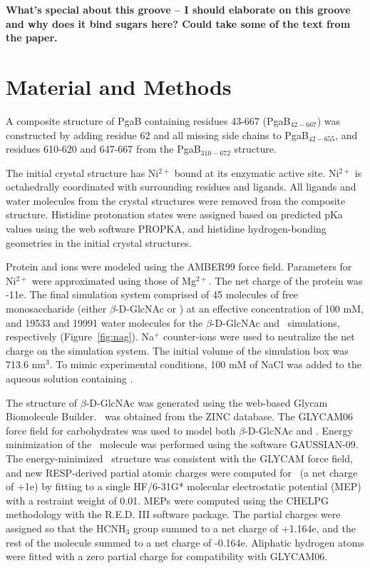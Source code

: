 \textbf{What's special about this groove -- I should elaborate on this groove and why does it bind sugars here? Could take some of the text from the paper.} 


\section{Material and Methods}

A composite structure of PgaB containing residues 43-667 (PgaB$_{42-667}$) was constructed by adding residue 62 and all missing side chains to PgaB$_{42-655}$, and residues 610-620 and 647-667 from the PgaB$_{310-672}$ structure.

The initial crystal structure has Ni$^{2+}$ bound at its enzymatic active site. Ni$^{2+}$ is octahedrally coordinated with surrounding residues and ligands. All ligands and water molecules from the crystal structures were removed from the composite structure. Histidine protonation states were assigned based on predicted pKa values using the web software PROPKA,\cite{Bas:2008ul,Olsson:2011vi,Sondergaard:2011ug} and histidine hydrogen-bonding geometries in the initial crystal structures.

Protein and ions were modeled using the AMBER99 force field.\cite{Cornell:1995td} Parameters for Ni$^{2+}$ were approximated using those of Mg$^{2+}$. The net charge of the protein was -11e. The final simulation system comprised of 45 molecules of free monosaccharide (either $\beta$-D-GlcNAc or \glucosamine) at an effective concentration of 100 mM, and 19533 and 19991 water molecules for the $\beta$-D-GlcNAc and \glucosamine\ simulations, respectively (Figure~\ref{fig:nag}). Na$^{+}$ counter-ions were used to neutralize the net charge on the simulation system. The initial volume of the simulation box was 713.6 nm$^{3}$. To mimic experimental conditions, 100 mM of NaCl was added to the aqueous solution containing \glucosamine. 

The structure of $\beta$-D-GlcNAc was generated using the web-based Glycam Biomolecule Builder.\cite{Woods:glycambuilder} \glucosamine\ was obtained from the ZINC database.\cite{Irwin:2005kx} The GLYCAM06 force field for carbohydrates\cite{Kirschner:2008ii} was used to model both $\beta$-D-GlcNAc and \glucosamine. Energy minimization of the \glucosamine\ molecule was performed using the software GAUSSIAN-09.\cite{g09} The energy-minimized \glucosamine\ structure was consistent with the GLYCAM force field, and new RESP-derived partial atomic charges were computed for \glucosamine\ (a net charge of +1e) by fitting to a single HF/6-31G* molecular electrostatic potential (MEP) with a restraint weight of 0.01. MEPs were computed using the CHELPG methodology\cite{Breneman:1990ue} with the R.E.D. III software package.\cite{Dupradeau:2010bb} The partial charges were assigned so that the HCNH$_{3}$ group summed to a net charge of +1.164e, and the rest of the molecule summed to a net charge of -0.164e. Aliphatic hydrogen atoms were fitted with a zero partial charge for compatibility with GLYCAM06.

